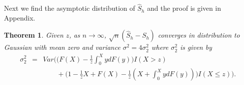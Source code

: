 \documentclass[11pt]{article}
\newtheorem{theorem}{Theorem}
\begin{document}
\noindent Next we find the asymptotic distribution of $\widehat{S}_h$ and the proof is given in Appendix.
\begin{theorem}
   Given $z$, as $n\rightarrow \infty$, $\sqrt{n}(\widehat{S}_h-S_h)$ converges in distribution to Gaussian with mean zero and variance $\sigma^2=4\sigma_2^2$ where $\sigma_2^2$ is given by
  \begin{eqnarray*}
  \sigma_2^2&=&Var\Big(\big(F(X)-\frac{1}{z}\int_{0}^{X}ydF(y)\big)I(X>z)\\&&\quad \quad +
  \big(1-\frac{1}{z}X+F(X)-\frac{1}{z}(X+\int_{0}^{X}ydF(y))\big)I(X\le z)\Big).
  \end{eqnarray*}
   \end{theorem}
\end{document}
